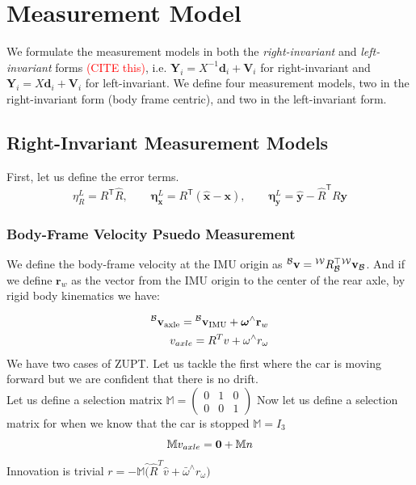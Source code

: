 \section{Measurement Model}
\label{sec:measurement_model}


We formulate the measurement models in both the \textit{right-invariant} and \textit{left-invariant} forms \textcolor{red}{(CITE this)}, i.e. $\mathbf{Y}_i = X^{-1} \mathbf{d}_i + \mathbf{V}_i$ for right-invariant and $\mathbf{Y}_i = X\mathbf{d}_i + \mathbf{V}_i$ for left-invariant. We define four measurement models, two in the right-invariant form (body frame centric), and two in the left-invariant form.

\subsection{Right-Invariant Measurement Models}
First, let us define the error terms. 
$$\eta^L_R = R^\mathsf{T}\hat R, \qquad \boldsymbol\eta^L_{\mathbf{x}} = R^\mathsf{T}(\hat{\mathbf{x}} - \mathbf{x}), \qquad \boldsymbol\eta^L_{\mathbf{y}} = \hat{\mathbf{y}} - \hat R^\mathsf{T}R\mathbf{y}$$



\subsubsection{Body-Frame Velocity Psuedo Measurement}

We define the body-frame velocity at the IMU origin as ${}^\mathcal{B}\mathbf{v} = {}^\mathcal{W}R_\mathcal{B}^\top {}^\mathcal{W}\mathbf{v}_{\mathcal{B}}$. And if we define $\mathbf{r}_w$ as the vector from the IMU origin to the center of the rear axle, by rigid body kinematics we have:

\begin{equation}
  \begin{aligned}
  {}^\mathcal{B}\mathbf{v}_{\mathrm{axle}} = {}^\mathcal{B}\mathbf{v}_{\mathrm{IMU}} + \boldsymbol{\omega}^\wedge \mathbf{r}_w
  \label{eq:axle_vel}\\
  v_{axle} = R^Tv+\omega^\wedge r_\omega 
\end{aligned}
\end{equation}
We have two cases of ZUPT. Let us tackle the first where the car is moving forward but we are confident that there is no drift.\\
Let us define a selection matrix $\mathbb{M} = \begin{pmatrix}0&1&0\\0&0&1 \end{pmatrix}$
Now let us define a selection matrix for when we know that the car is stopped $\mathbb{M} = I_3$
\begin{equation}
  \mathbb{M}v_{axle} = \mathbf{0}+\mathbb{M}n\\
\end{equation}
Innovation is trivial $r=-\mathbb{M}\hat (\hat R^T \hat v+\bar \omega ^\wedge r_{\omega})$\\

